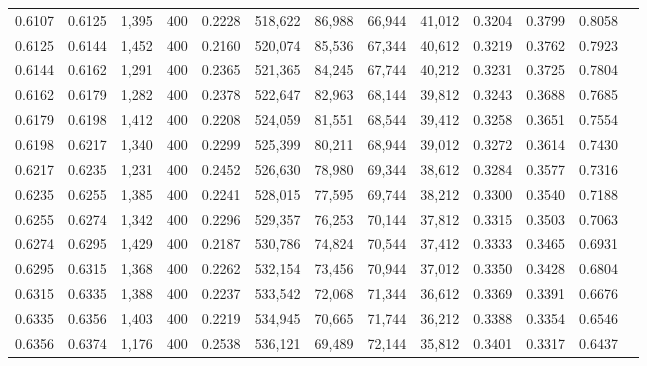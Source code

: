 \begin{tabular}{rrrrrrrrrrrrr}
0.6107 & 0.6125 &  1,395 & 400 &                                     0.2228 & 518,622 &  86,988 &  66,944 &  41,012 & 0.3204 & 0.3799 & 0.8058 \\
0.6125 & 0.6144 &  1,452 & 400 &                                     0.2160 & 520,074 &  85,536 &  67,344 &  40,612 & 0.3219 & 0.3762 & 0.7923 \\
0.6144 & 0.6162 &  1,291 & 400 &                                     0.2365 & 521,365 &  84,245 &  67,744 &  40,212 & 0.3231 & 0.3725 & 0.7804 \\
0.6162 & 0.6179 &  1,282 & 400 &                                     0.2378 & 522,647 &  82,963 &  68,144 &  39,812 & 0.3243 & 0.3688 & 0.7685 \\
0.6179 & 0.6198 &  1,412 & 400 &                                     0.2208 & 524,059 &  81,551 &  68,544 &  39,412 & 0.3258 & 0.3651 & 0.7554 \\
0.6198 & 0.6217 &  1,340 & 400 &                                     0.2299 & 525,399 &  80,211 &  68,944 &  39,012 & 0.3272 & 0.3614 & 0.7430 \\
0.6217 & 0.6235 &  1,231 & 400 &                                     0.2452 & 526,630 &  78,980 &  69,344 &  38,612 & 0.3284 & 0.3577 & 0.7316 \\
0.6235 & 0.6255 &  1,385 & 400 &                                     0.2241 & 528,015 &  77,595 &  69,744 &  38,212 & 0.3300 & 0.3540 & 0.7188 \\
0.6255 & 0.6274 &  1,342 & 400 &                                     0.2296 & 529,357 &  76,253 &  70,144 &  37,812 & 0.3315 & 0.3503 & 0.7063 \\
0.6274 & 0.6295 &  1,429 & 400 &                                     0.2187 & 530,786 &  74,824 &  70,544 &  37,412 & 0.3333 & 0.3465 & 0.6931 \\
0.6295 & 0.6315 &  1,368 & 400 &                                     0.2262 & 532,154 &  73,456 &  70,944 &  37,012 & 0.3350 & 0.3428 & 0.6804 \\
0.6315 & 0.6335 &  1,388 & 400 &                                     0.2237 & 533,542 &  72,068 &  71,344 &  36,612 & 0.3369 & 0.3391 & 0.6676 \\
0.6335 & 0.6356 &  1,403 & 400 &                                     0.2219 & 534,945 &  70,665 &  71,744 &  36,212 & 0.3388 & 0.3354 & 0.6546 \\
0.6356 & 0.6374 &  1,176 & 400 &                                     0.2538 & 536,121 &  69,489 &  72,144 &  35,812 & 0.3401 & 0.3317 & 0.6437 \\

\end{tabular}
